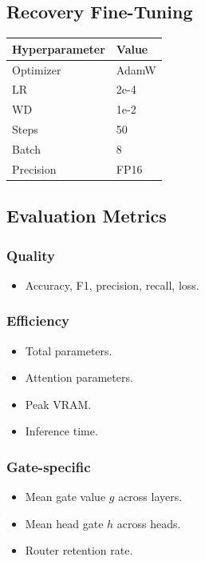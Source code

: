 \subsection{Recovery Fine-Tuning}

\begin{table}[H]
\centering
\small
\begin{tabular}{ll}
\toprule
\textbf{Hyperparameter} & \textbf{Value} \\
\midrule
Optimizer & AdamW \\
LR & 2e-4 \\
WD & 1e-2 \\
Steps & 50 \\
Batch & 8 \\
Precision & FP16 \\
\bottomrule
\end{tabular}
\end{table}

\subsection{Evaluation Metrics}

\subsubsection{Quality}
\begin{itemize}
\item Accuracy, F1, precision, recall, loss.

\end{itemize}
\subsubsection{Efficiency}
\begin{itemize}
\item Total parameters.
\item Attention parameters.
\item Peak VRAM.
\item Inference time.

\end{itemize}
\subsubsection{Gate-specific}
\begin{itemize}
\item Mean gate value $g$ across layers.
\item Mean head gate $h$ across heads.
\item Router retention rate.

\end{itemize}
